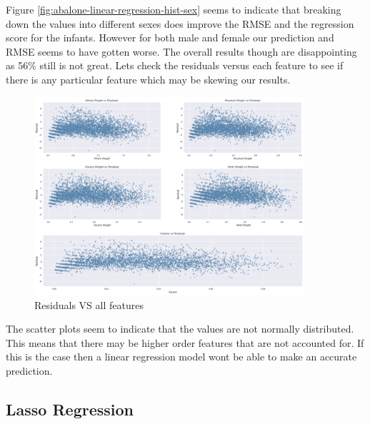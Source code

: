 Figure \ref{fig:abalone-linear-regression-hist-sex} seems to indicate that breaking down the values into different sexes does improve the RMSE and the regression score for the infants. However for both male and female our prediction and RMSE seems to have gotten worse. The overall results though are disappointing as 56\% still is not great. Lets check the residuals versus each feature to see if there is any particular feature which may be skewing our results.
\begin{figure}[H]
  \centering
  \includegraphics[scale=0.5,width=100mm]{./images/abalone-residuals-vs-features.png}
  \caption{Residuals VS all features}
  \label{fig:abalone-residuals-vs-features}
\end{figure}
The scatter plots seem to indicate that the values are not normally distributed. This means that there may be higher order features that are not accounted for. If this is the case then a linear regression model wont be able to make an accurate prediction. 

\subsection{Lasso Regression}

